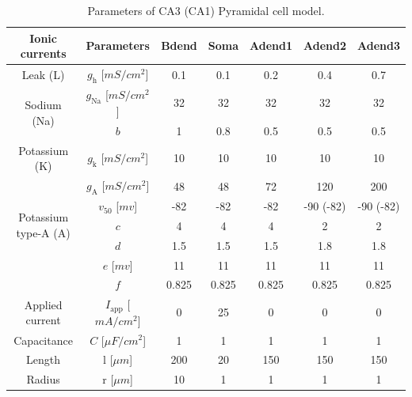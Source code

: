\documentclass[../main.tex]{subfiles}
\begin{document}
\begin{table}[htb]
\caption{Parameters of CA3 (CA1) Pyramidal cell model.}
\begin{center}
\def\arraystretch{1.3}%
\begin{tabular}{|c|c|c|c|c|c|c|}
\hline
 Ionic currents &Parameters & Bdend & Soma & Adend1 & Adend2 & Adend3 \\
 \hline
  Leak (L)     & $g_{\text{h}}$ [$mS/cm^2$] & 0.1 & 0.1 & 0.2 & 0.4 & 0.7 \\  \hline
  \multirow{2}{*}{Sodium (Na)}  & $g_{\text{Na}}$ [$mS/cm^2$]& 32  & 32  & 32  & 32  & 32  \\ \cline{2-7}
                                  & $b$ & 1 & 0.8 & 0.5 & 0.5 & 0.5 \\ \hline
  Potassium (K) & $g_{\text{k}}$ [$mS/cm^2$] & 10  & 10  & 10  & 10  & 10  \\  \hline
  
  \multirow{5}{2cm}{Potassium type-A (A)} & $g_{\text{A}}$ [$mS/cm^2$] & 48  & 48  & 72  & 120 & 200  \\ \cline{2-7} 
                                     & $v_{50}$ [$mv$] & -82 & -82 & -82 & -90 (-82) & -90 (-82) \\ \cline{2-7}
                                     & $c$ & 4 &  4  & 4   & 2 & 2                               \\ \cline{2-7}
                                     & $d$ & 1.5 & 1.5 & 1.5 & 1.8 & 1.8                         \\ \cline{2-7}
                                     & $e$ [$mv$] & 11 & 11  & 11 & 11 & 11                      \\ \cline{2-7} 
                                     & $f$ & 0.825 & 0.825 & 0.825 & 0.825 & 0.825 \\ 
  \hline
  \hline
  Applied current & $I_{\text{app}}$ [$mA/cm^2$] & 0 & 25 & 0 & 0 & 0 \\\hline
  Capacitance     & $C$ [$\mu F/cm^2$]           & 1 & 1  & 1 & 1 & 1 \\ \hline
  Length & l [$\mu m$] & 200 & 20 & 150 & 150 & 150 \\ \hline
  Radius & r [$\mu m$] & 10  & 1  & 1   & 1   & 1   \\ \hline
\end{tabular}
\label{table:pyr-parameters}
\end{center}
\end{table} 
\end{document}
